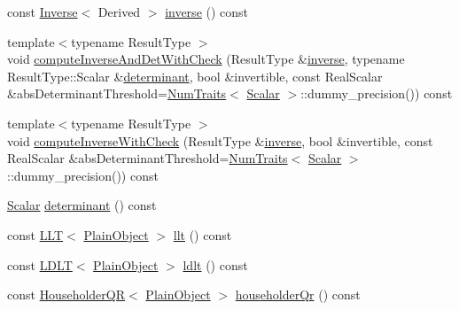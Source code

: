 \begin{DoxyCompactItemize}
\item 
const \mbox{\hyperlink{class_eigen_1_1_inverse}{Inverse}}$<$ Derived $>$ \mbox{\hyperlink{class_eigen_1_1_matrix_base_a7712eb69e8ea3c8f7b8da1c44dbdeebf}{inverse}} () const
\item 
{\footnotesize template$<$typename Result\+Type $>$ }\\void \mbox{\hyperlink{class_eigen_1_1_matrix_base_a7baaf2fdec0191a2166cf9fd84a2dcb2}{compute\+Inverse\+And\+Det\+With\+Check}} (Result\+Type \&\mbox{\hyperlink{class_eigen_1_1_matrix_base_a7712eb69e8ea3c8f7b8da1c44dbdeebf}{inverse}}, typename Result\+Type\+::\+Scalar \&\mbox{\hyperlink{class_eigen_1_1_matrix_base_a7ad8f77004bb956b603bb43fd2e3c061}{determinant}}, bool \&invertible, const Real\+Scalar \&abs\+Determinant\+Threshold=\mbox{\hyperlink{struct_eigen_1_1_num_traits}{Num\+Traits}}$<$ \mbox{\hyperlink{class_eigen_1_1_dense_base_a5feed465b3a8e60c47e73ecce83e39a2}{Scalar}} $>$\+::dummy\+\_\+precision()) const
\item 
{\footnotesize template$<$typename Result\+Type $>$ }\\void \mbox{\hyperlink{class_eigen_1_1_matrix_base_a116f3b50d2af7dbdf7473e517a5b8b0f}{compute\+Inverse\+With\+Check}} (Result\+Type \&\mbox{\hyperlink{class_eigen_1_1_matrix_base_a7712eb69e8ea3c8f7b8da1c44dbdeebf}{inverse}}, bool \&invertible, const Real\+Scalar \&abs\+Determinant\+Threshold=\mbox{\hyperlink{struct_eigen_1_1_num_traits}{Num\+Traits}}$<$ \mbox{\hyperlink{class_eigen_1_1_dense_base_a5feed465b3a8e60c47e73ecce83e39a2}{Scalar}} $>$\+::dummy\+\_\+precision()) const
\item 
\mbox{\hyperlink{class_eigen_1_1_dense_base_a5feed465b3a8e60c47e73ecce83e39a2}{Scalar}} \mbox{\hyperlink{class_eigen_1_1_matrix_base_a7ad8f77004bb956b603bb43fd2e3c061}{determinant}} () const
\item 
const \mbox{\hyperlink{class_eigen_1_1_l_l_t}{L\+LT}}$<$ \mbox{\hyperlink{class_eigen_1_1_dense_base_aae45af9b5aca5a9caae98fd201f47cc4}{Plain\+Object}} $>$ \mbox{\hyperlink{class_eigen_1_1_matrix_base_a90c45f7a30265df792d5aeaddead2635}{llt}} () const
\item 
const \mbox{\hyperlink{class_eigen_1_1_l_d_l_t}{L\+D\+LT}}$<$ \mbox{\hyperlink{class_eigen_1_1_dense_base_aae45af9b5aca5a9caae98fd201f47cc4}{Plain\+Object}} $>$ \mbox{\hyperlink{class_eigen_1_1_matrix_base_a0ecf058a0727a4cab8b42d79e95072e1}{ldlt}} () const
\item 
const \mbox{\hyperlink{class_eigen_1_1_householder_q_r}{Householder\+QR}}$<$ \mbox{\hyperlink{class_eigen_1_1_dense_base_aae45af9b5aca5a9caae98fd201f47cc4}{Plain\+Object}} $>$ \mbox{\hyperlink{class_eigen_1_1_matrix_base_a9a9377aab1cea26db5f25bab7e682f8f}{householder\+Qr}} () const

\end{DoxyCompactItemize}
